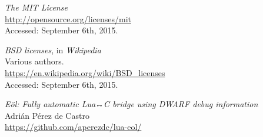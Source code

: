 \begin{thebibliography}{99}
		\emph{The MIT License} \\
		\url{http://opensource.org/licenses/mit} \\
		Accessed: September 6th, 2015.

		\emph{BSD licenses}, in \emph{Wikipedia} \\
		Various authors. \\
		\url{https://en.wikipedia.org/wiki/BSD_licenses} \\
		Accessed: September 6th, 2015.

		\emph{Eöl: Fully automatic Lua↔C bridge using DWARF debug information} \\
		Adrián Pérez de Castro \\
		\url{https://github.com/aperezdc/lua-eol/}

\end{thebibliography}


